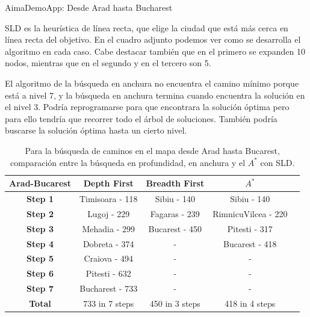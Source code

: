 \documentclass[11pt, a4paper, spanish, openright, twoside]{book}
\begin{document}
\begin{section}{AimaDemoApp: Desde Arad hasta Bucharest}

SLD es la heurística de línea recta, que elige la ciudad que está más cerca en línea recta del objetivo. En el cuadro adjunto podemos ver como se desarrolla el algoritmo en cada caso. Cabe destacar también que en el primero se expanden 10 nodos, mientras que en el segundo y en el tercero son 5.

El algoritmo de la búsqueda en anchura no encuentra el camino mínimo porque está a nivel 7, y la búsqueda en anchura termina cuando encuentra la solución en el nivel 3. Podría reprogramarse para que encontrara la solución óptima pero para ello tendría que recorrer 
todo el árbol de soluciones. También podría buscarse la solución óptima hasta un cierto nivel. 

	\begin{table}	
		\begin{center}
			\begin{tabular}{|c||c|c|c|c|}
				\hline \textbf{Arad-Bucarest}	& \textbf{Depth First} 	& \textbf{Breadth First} 	& $A^*$ \\ \hline \hline
				\textbf{Step 1} 			&  	Timisoara - 118	& Sibiu - 140			& Sibiu - 140			\\ \hline 
				\textbf{Step 2} 			&  	Lugoj - 229		& Fagaras - 239		& RimnicuVilcea - 220	\\ \hline 
				\textbf{Step 3} 			&  	Mehadia - 299		& Bucarest - 450		& Pitesti - 317			\\ \hline 
				\textbf{Step 4} 			&  	Dobreta - 374		& -					& Bucarest - 418		\\ \hline 
				\textbf{Step 5} 			&  	Craiova - 494		& -					& -					\\ \hline 
				\textbf{Step 6} 			&  	Pitesti - 632		& -					& - 					\\ \hline 
				\textbf{Step 7} 			&  	Bucharest - 733	& -					& -					\\ \hline \hline
				\textbf{Total} 			&  	733 in 7 steps		&  450 in 3 steps		& 418 in 4 steps		\\ \hline 

			\end{tabular}
		\caption{Para la búsqueda de caminos en el mapa desde Arad hasta Bucarest, comparación entre la búsqueda en profundidad, en anchura y el $A^*$ con SLD.}
		\end{center}
	\end{table}


\end{section}
\end{document}
